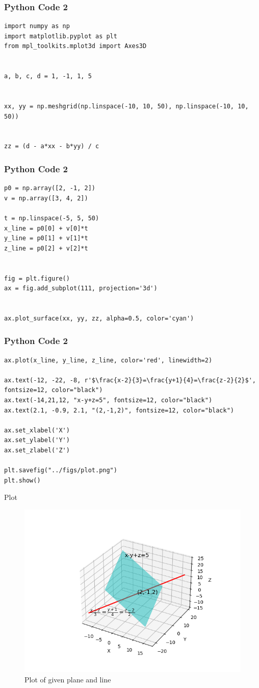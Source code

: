 \documentclass{beamer}
\begin{document}
\begin{frame}[fragile]
    \frametitle{Python Code 2}
    \begin{lstlisting}
import numpy as np
import matplotlib.pyplot as plt
from mpl_toolkits.mplot3d import Axes3D


a, b, c, d = 1, -1, 1, 5   


xx, yy = np.meshgrid(np.linspace(-10, 10, 50), np.linspace(-10, 10, 50))


zz = (d - a*xx - b*yy) / c
    \end{lstlisting}
\end{frame}

\begin{frame}[fragile]
    \frametitle{Python Code 2}
    \begin{lstlisting}
p0 = np.array([2, -1, 2])   
v = np.array([3, 4, 2])    

t = np.linspace(-5, 5, 50)
x_line = p0[0] + v[0]*t
y_line = p0[1] + v[1]*t
z_line = p0[2] + v[2]*t


fig = plt.figure()
ax = fig.add_subplot(111, projection='3d')


ax.plot_surface(xx, yy, zz, alpha=0.5, color='cyan')    \end{lstlisting}
\end{frame}

\begin{frame}[fragile]
    \frametitle{Python Code 2}
    \begin{lstlisting}
ax.plot(x_line, y_line, z_line, color='red', linewidth=2)

ax.text(-12, -22, -8, r'$\frac{x-2}{3}=\frac{y+1}{4}=\frac{z-2}{2}$', fontsize=12, color="black")
ax.text(-14,21,12, "x-y+z=5", fontsize=12, color="black")
ax.text(2.1, -0.9, 2.1, "(2,-1,2)", fontsize=12, color="black")

ax.set_xlabel('X')
ax.set_ylabel('Y')
ax.set_zlabel('Z')

plt.savefig("../figs/plot.png")
plt.show()    \end{lstlisting}
\end{frame}

\begin{frame}{Plot}
    \begin{figure}
        \centering
        \includegraphics[width=0.5\columnwidth]{../figs/plot.png}
        \caption{Plot of given plane and line}
        \label{fig:fig}
    \end{figure}
\end{frame}
\end{document}
